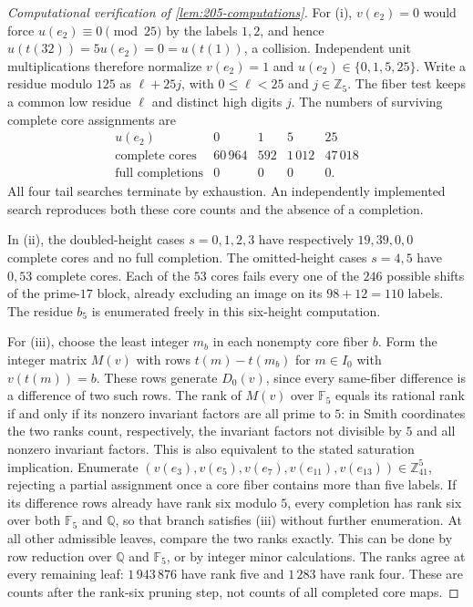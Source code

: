 \documentclass[11pt,reqno]{amsart}
\newcommand{\Z}{\mathbb Z}
\newcommand{\Q}{\mathbb Q}
\newcommand{\F}{\mathbb F}
\theoremstyle{definition}
\theoremstyle{remark}
\numberwithin{equation}{section}
\begin{document}
\begin{proof}[Computational verification of \cref{lem:205-computations}]
For (i), $v(e_2)=0$ would force $u(e_2)\equiv0\pmod{25}$ by the
labels $1,2$, and hence $u(t(32))=5u(e_2)=0=u(t(1))$, a collision.
Independent unit multiplications therefore normalize $v(e_2)=1$ and
$u(e_2)\in\{0,1,5,25\}$. Write a residue modulo $125$ as
$\ell+25j$, with $0\le\ell<25$ and $j\in\Z_5$.
The fiber test keeps a common low residue $\ell$ and distinct high
digits $j$. The numbers
of surviving complete core assignments are
\[
\begin{array}{c|rrrr}
 u(e_2)&0&1&5&25\\ \hline
 \text{complete cores}&60\,964&592&1\,012&47\,018\\
 \text{full completions}&0&0&0&0.
\end{array}
\]
All four tail searches terminate by exhaustion. An independently
implemented search reproduces both these core counts and the absence
of a completion.

In (ii), the doubled-height cases $s=0,1,2,3$ have respectively
$19,39,0,0$ complete cores and no full completion. The omitted-height
cases $s=4,5$ have $0,53$ complete cores. Each of the $53$ cores fails
every one of the $246$ possible shifts of the prime-$17$ block, already
excluding an image on its $98+12=110$ labels. The residue $b_5$ is
enumerated freely in this six-height computation.

For (iii), choose the least integer $m_b$ in each nonempty core
fiber $b$. Form the integer matrix $M(v)$ with rows
$t(m)-t(m_b)$ for $m\in I_0$ with $v(t(m))=b$.
These rows generate $D_0(v)$, since every same-fiber difference is
a difference of two such rows. The rank of $M(v)$ over $\F_5$
equals its rational rank if and only if
its nonzero invariant factors are all prime to $5$: in Smith coordinates
the two ranks count, respectively, the invariant factors not divisible
by $5$ and all nonzero invariant factors. This is also equivalent to
the stated saturation implication. Enumerate
$(v(e_3),v(e_5),v(e_7),v(e_{11}),v(e_{13}))\in\Z_{41}^5$,
rejecting a partial assignment once a core fiber contains more than
five labels. If its difference rows already have rank six modulo $5$,
every completion has rank six over both $\F_5$ and $\Q$, so that
branch satisfies (iii) without further enumeration.
At all other admissible leaves, compare the two ranks exactly.
This can be done by row reduction over $\Q$ and $\F_5$, or by
integer minor calculations. The ranks agree at every remaining leaf:
$1\,943\,876$ have rank five and $1\,283$ have rank four.
These are counts after the rank-six pruning step, not counts of
all completed core maps.


\end{proof}
\end{document}
